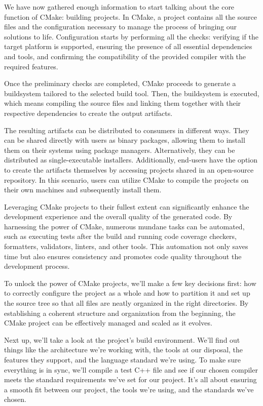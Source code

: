 We have now gathered enough information to start talking about the core function of CMake: building projects. In CMake, a project contains all the source files and the configuration necessary to manage the process of bringing our solutions to life. Configuration starts by performing all the checks: verifying if the target platform is supported, ensuring the presence of all essential dependencies and tools, and confirming the compatibility of the provided compiler with the required features.

Once the preliminary checks are completed, CMake proceeds to generate a buildsystem tailored to the selected build tool. Then, the buildsystem is executed, which means compiling the source files and linking them together with their respective dependencies to create the output artifacts.

The resulting artifacts can be distributed to consumers in different ways. They can be shared directly with users as binary packages, allowing them to install them on their systems using package managers. Alternatively, they can be distributed as single-executable installers. Additionally, end-users have the option to create the artifacts themselves by accessing projects shared in an open-source repository. In this scenario, users can utilize CMake to compile the projects on their own machines and subsequently install them.

Leveraging CMake projects to their fullest extent can significantly enhance the development experience and the overall quality of the generated code. By harnessing the power of CMake, numerous mundane tasks can be automated, such as executing tests after the build and running code coverage checkers, formatters, validators, linters, and other tools. This automation not only saves time but also ensures consistency and promotes code quality throughout the development process.

To unlock the power of CMake projects, we’ll make a few key decisions first: how to correctly configure the project as a whole and how to partition it and set up the source tree so that all files are neatly organized in the right directories. By establishing a coherent structure and organization from the beginning, the CMake project can be effectively managed and scaled as it evolves.

Next up, we’ll take a look at the project’s build environment. We’ll find out things like the architecture we’re working with, the tools at our disposal, the features they support, and the language standard we’re using. To make sure everything is in sync, we’ll compile a test C++ file and see if our chosen compiler meets the standard requirements we’ve set for our project. It’s all about ensuring a smooth fit between our project, the tools we’re using, and the standards we’ve chosen.

